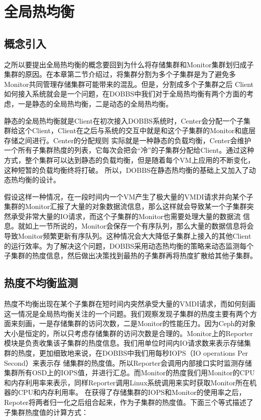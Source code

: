 \section{全局热均衡}
\subsection{概念引入}
之所以要提出全局热均衡的概念要回到为什么将存储集群和Monitor集群划归成子集群的原因。在本章第二节介绍过，将集群分割为多个子集群是为了避免多Monitor共同管理存储集群可能带来的混乱。但是，分割成多个子集群之后
Client如何接入系统就会是一个问题，在DOBBS中我们对于全局热均衡有两个方面的考虑，一是静态的全局热均衡，二是动态的全局热均衡。

静态的全局热均衡就是Client在初次接入DOBBS系统时，Center会分配一个子集群给这个Client，Client在之后与系统的交互中就是和这个子集群的Monitor和底层存储之间进行。Center的分配规则
实际就是一种静态的负载均衡，Center会维护一个所有子集群热度的列表，它每次会把会“冷”的子集群分配给Client。通过这种方式，整个集群可以达到静态的负载均衡，但是随着每个VM上应用的不断变化，这种短暂的负载均衡终将打破。
所以，DOBBS在静态热均衡的基础上又加入了动态热均衡的设计。

假设这样一种情况，在一段时间内一个VM产生了极大量的VMDI请求并向某个子集群的Monitor汇报了大量的对象数据流信息，那么这样就会导致某一个子集群突然承受非常大量的IO请求，而这个子集群的Monitor也需要处理大量的数据流
信息。就如上一节所说的，Monitor会保存一个有序队列，那么大量的数据信息将会导致Monitor频繁更新有序队列。这种情况会大大降低子集群上接入的其他Client的运行效率。为了解决这个问题，DOBBS采用动态热均衡的策略来动态监测每个
子集群的热度信息，然后做出决策找到最热的子集群再将热度扩散给其他子集群。

\subsection{热度不均衡监测}
热度不均衡出现在某个子集群在短时间内突然承受大量的VMDI请求，而如何刻画这一情况是全局热均衡关注的一个问题。我们观察发现子集群的热度主要有两个方面来刻画，一是存储集群的访问次数，二是Monitor的性能压力。因为Ceph的对象
大小是恒定的，所以只考虑存储集群的访问次数是合理的。Monitor上的Reporter模块是负责收集该子集群的热度信息。我们用单位时间内IO请求数来表示存储集群的热度，更加细致地来说，在DOBBS中我们用每秒IOPS（IO operations Per Second）来表示存
储集群的热度值。所以Reporter会调用内部接口实时监测存储集群所有OSD上的IOPS值，并进行汇总。而Monitor的热度我们用Monitor的CPU和内存利用率来表示，同样Reporter调用Linux系统调用来实时获取Monitor所在机器的CPU和内存利用率。
在获得了存储集群的IOPS和Monitor的使用率之后，Repoter将两者归一化之后组合起来，作为子集群的热度值。下面三个等式描述了子集群热度值的计算方式：

